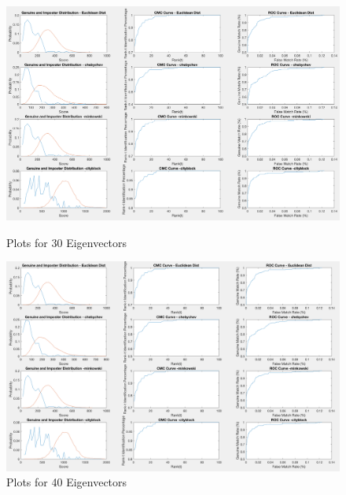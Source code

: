 \documentclass[10pt, letterpaper]{article}
\begin{document}
\begin{figure}
\includegraphics[width=\linewidth]{images/for30coeff}
 \caption{ Plots for 30 Eigenvectors}
 \label{fig:30coeff}
 
 \includegraphics[width=\linewidth]{images/for40coeff}
 \caption{ Plots for 40 Eigenvectors}
 \label{fig:40coeff}
  
\end{figure}
\end{document}
